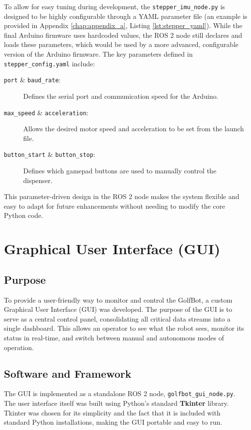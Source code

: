 To allow for easy tuning during development, the \texttt{stepper\_imu\_node.py} is designed to be highly configurable through a YAML parameter file (an example is provided in Appendix \ref{chap:appendix_a}, Listing \ref{lst:stepper_yaml}). While the final Arduino firmware uses hardcoded values, the ROS 2 node still declares and loads these parameters, which would be used by a more advanced, configurable version of the Arduino firmware. The key parameters defined in \texttt{stepper\_config.yaml} include:
\begin{description}
    \item[\texttt{port} \& \texttt{baud\_rate}:] Defines the serial port and communication speed for the Arduino.
    \item[\texttt{max\_speed} \& \texttt{acceleration}:] Allows the desired motor speed and acceleration to be set from the launch file.
    \item[\texttt{button\_start} \& \texttt{button\_stop}:] Defines which gamepad buttons are used to manually control the dispenser.
\end{description}
This parameter-driven design in the ROS 2 node makes the system flexible and easy to adapt for future enhancements without needing to modify the core Python code.

\section{Graphical User Interface (GUI)}
\label{sec:gui_implementation}

\subsection{Purpose}
\label{ssec:gui_intro}
To provide a user-friendly way to monitor and control the GolfBot, a custom Graphical User Interface (GUI) was developed. The purpose of the GUI is to serve as a central control panel, consolidating all critical data streams into a single dashboard. This allows an operator to see what the robot sees, monitor its status in real-time, and switch between manual and autonomous modes of operation.

\subsection{Software and Framework}
\label{ssec:gui_software}
The GUI is implemented as a standalone ROS 2 node, \texttt{golfbot\_gui\_node.py}. The user interface itself was built using Python's standard \textbf{Tkinter} library. Tkinter was chosen for its simplicity and the fact that it is included with standard Python installations, making the GUI portable and easy to run.

